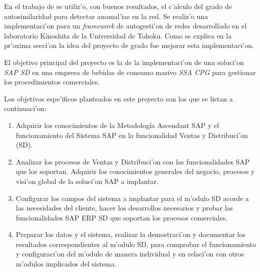 En el trabajo de \cite{mingliddos} se utiliz'o, con buenos resultados, el
c'alculo del grado de autosimilaridad para detectar anomal'ias en la red. Se
realiz'o una implementaci'on para un {\it framework} de autogesti'on de redes
desarrollado en el laboratorio Kinoshita de la Universidad de Tohoku. Como se
explica en la pr'oxima secci'on la idea del proyecto de grado fue mejorar esta
implementaci'on.

\vspace{5 mm}

\label{sect:objetivo_general}
\vspace{5 mm}

\indent El objetivo principal del proyecto es la de la implementaci'on de una soluci'on \emph{SAP SD} en una empresa de bebidas de consumo masivo \emph{SSA CPG} para gestionar los procedimientos comerciales. 


\vspace{5 mm}

\label{sect:objetivos_especificos}
\vspace{5 mm}

 Los objetivos espe'ificos planteados en este proyecto son los que se listan a continuaci'on:
\begin{enumerate}
\item Adquirir los conocimientos de la Metodología Ascendant SAP y el funcionamiento del Sistema SAP en la funcionalidad Ventas y Distribuci'on (SD).

\item Analizar los procesos de Ventas y Distribuci'on con las funcionalidades SAP que los soportan. Adquirir los conocimientos generales del negocio, procesos y visi'on global de la soluci'on SAP a implantar.

\item Configurar los campos del sistema a implantar para el m'odulo SD acorde a las necesidades del cliente, hacer los desarrollos necesarios y probar las funcionalidades SAP ERP SD que soportan los procesos comerciales.

\item Preparar los datos y el sistema, realizar la demostraci'on y documentar los resultados correspondientes al m'odulo SD, para comprobar el funcionamiento y configuraci'on del m'odulo de manera individual y en relaci'on con otros m'odulos implicados del sistema.

\end{enumerate}




